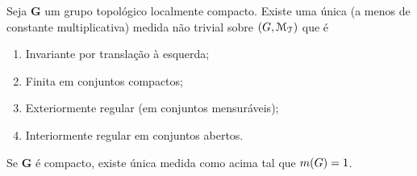 \begin{proposition}
Seja $\bm G$ um grupo topológico localmente compacto. Existe uma única (a menos de constante multiplicativa) medida não trivial sobre $(G,\mathcal{M}_{\mathcal{T}})$ que é
	\begin{enumerate}
	\item Invariante por translação à esquerda;
	\item Finita em conjuntos compactos;
	\item Exteriormente regular (em conjuntos mensuráveis);
	\item Interiormente regular em conjuntos abertos.
	\end{enumerate}

Se $\bm G$ é compacto, existe única medida como acima tal que $m(G)=1$.
\end{proposition}


